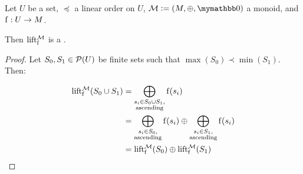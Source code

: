 \begin{proposition}
Let $U$ be a set, $\preceq$ a linear order on $U$, $\mathcal{M} \defeq (M, \groupaddsym, \neutraladd)$ a monoid, and ${\operatorname{f}}: {U} \rightarrow {M}$.

Then $\operatorname{lift_{\operatorname{f}}^{\mathcal{M}}}$ is a \somewhatmorphism.

\begin{proof}
Let $S_0, S_1 \in \mathcal{P}({U})$ be finite sets such that $\max(S_0) \prec \min(S_1)$. Then:

\begin{align*}
\operatorname{lift_{\operatorname{f}}^{\mathcal{M}}}(S_0 \cup S_1) &= \bigoplus_{\substack{s_i \in S_0 \cup S_1,\\ \text{ascending}}} \operatorname{f}(s_i)\\
&= \bigoplus_{\substack{s_i \in S_0,\\ \text{ascending}}} \operatorname{f}(s_i) \oplus \bigoplus_{\substack{s_i \in S_1,\\ \text{ascending}}} \operatorname{f}(s_i)\\
&= \operatorname{lift_{\operatorname{f}}^{\mathcal{M}}}(S_0) \oplus \operatorname{lift_{\operatorname{f}}^{\mathcal{M}}}(S_1)\\
\end{align*}
\end{proof}
\end{proposition}

